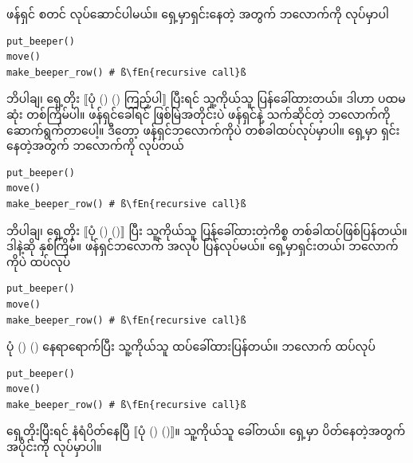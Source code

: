 ဖန်ရှင် စတင် လုပ်ဆောင်ပါမယ်။  ရှေ့မှာရှင်းနေတဲ့ အတွက်  ဘလောက်ကို လုပ်မှာပါ
%
\setlength{\fboxsep}{0pt}
\begin{verbatim}
put_beeper()
move()
make_beeper_row() # ß\fEn{recursive call}ß
\end{verbatim}
%
ဘိပါချ၊ ရှေ့တိုး $\big\llbracket$ပုံ (\fRefNo{\ref{fig:mrofb_recur}}) ()  ကြည့်ပါ$\big\rrbracket$ ပြီးရင် သူ့ကိုယ်သူ  ပြန်ခေါ်ထားတယ်။ ဒါဟာ ပထမဆုံး တစ်ကြိမ်ပါ။ ဖန်ရှင်ခေါ်ရင် ဖြစ်မြဲအတိုင်းပဲ ဖန်ရှင်နဲ့ သက်ဆိုင်တဲ့ ဘလောက်ကို ဆောက်ရွက်တာပေါ့။ ဒီတော့  ဖန်ရှင်ဘလောက်ကိုပဲ တစ်ခါထပ်လုပ်မှာပါ။ ရှေ့မှာ ရှင်းနေတဲ့အတွက်  ဘလောက်ကို လုပ်တယ်
%
\setlength{\fboxsep}{0pt}
\begin{verbatim}
put_beeper()
move()
make_beeper_row() # ß\fEn{recursive call}ß
\end{verbatim}
%
ဘိပါချ၊ ရှေ့တိုး $\big\llbracket$ပုံ (\fRefNo{\ref{fig:mrofb_recur}}) ()$\big\rrbracket$ ပြီး သူ့ကိုယ်သူ ပြန်ခေါ်ထားတဲ့ကိစ္စ တစ်ခါထပ်ဖြစ်ပြန်တယ်။ ဒါနဲ့ဆို နှစ်ကြိမ်။ ဖန်ရှင်ဘလောက် အလုပ် ပြန်လုပ်မယ်။ ရှေ့မှာရှင်းတယ်၊  ဘလောက်ကိုပဲ ထပ်လုပ်
%
\setlength{\fboxsep}{0pt}
\begin{verbatim}
put_beeper()
move()
make_beeper_row() # ß\fEn{recursive call}ß
\end{verbatim}
%
ပုံ (\fRefNo{\ref{fig:mrofb_recur}}) () နေရာရောက်ပြီး သူ့ကိုယ်သူ ထပ်ခေါ်ထားပြန်တယ်။  ဘလောက် ထပ်လုပ်
%
\setlength{\fboxsep}{0pt}
\begin{verbatim}
put_beeper()
move()
make_beeper_row() # ß\fEn{recursive call}ß
\end{verbatim}
%
ရှေ့တိုးပြီးရင် နံရံပိတ်နေပြီ $\big\llbracket$ပုံ (\fRefNo{\ref{fig:mrofb_recur}}) ()$\big\rrbracket$။ သူ့ကိုယ်သူ ခေါ်တယ်။ ရှေ့မှာ ပိတ်နေတဲ့အတွက်  အပိုင်းကို လုပ်မှာပါ။
